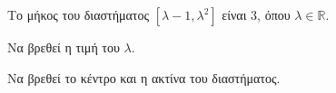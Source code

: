 Το μήκος του διαστήματος $ [\lambda-1,\lambda^2] $ είναι $ 3 $, όπου $ \lambda\in\mathbb{R} $.
\begin{alist}
\item Να βρεθεί η τιμή του $ \lambda $.
\item Να βρεθεί το κέντρο και η ακτίνα του διαστήματος.
\end{alist}
